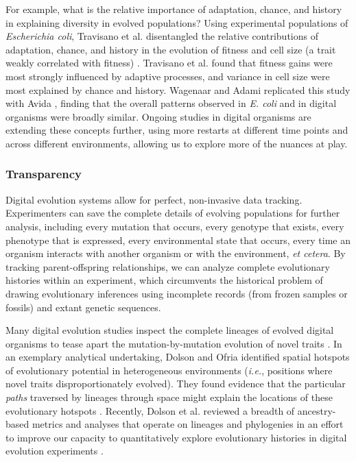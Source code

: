 For example, what is the relative importance of adaptation, chance, and history in explaining diversity in evolved populations? 
Using experimental populations of \textit{Escherichia coli}, Travisano et al. disentangled the relative contributions of adaptation, chance, and history in the evolution of fitness and cell size (a trait weakly correlated with fitness) \citep{travisano_experimental_1995}.
Travisano et al. found that fitness gains were most strongly influenced by adaptive processes, and variance in cell size were most explained by chance and history. 
Wagenaar and Adami replicated this study with Avida \citep{wagenaar_influence_2004}, finding that the overall patterns observed in \textit{E. coli} and in digital organisms were broadly similar.
Ongoing studies in digital organisms are extending these concepts further, using more restarts at different time points and across different environments, allowing us to explore more of the nuances at play.

\subsubsection{Transparency}

Digital evolution systems allow for perfect, non-invasive data tracking.
Experimenters can save the complete details of evolving populations for further analysis, including every mutation that occurs, every genotype that exists, every phenotype that is expressed, every environmental state that occurs, every time an organism interacts with another organism or with the environment, \textit{et cetera}.
By tracking parent-offspring relationships, we can analyze complete evolutionary histories within an experiment, which circumvents the historical problem of drawing evolutionary inferences using incomplete records (from frozen samples or fossils) and extant genetic sequences.

Many digital evolution studies inspect the complete lineages of evolved digital organisms to tease apart the mutation-by-mutation evolution of novel traits \citep{lenski_evolutionary_2003,dolson_spatial_2017,grabowski_case_2013,goldsby_evolutionary_2014,pontes_evolutionary_2020}.
In an exemplary analytical undertaking, Dolson and Ofria identified spatial hotspots of evolutionary potential in heterogeneous environments (\textit{i.e.}, positions where novel traits disproportionately evolved).
They found evidence that the particular \textit{paths} traversed by lineages through space might explain the locations of these evolutionary hotspots \citep{dolson_hotspots_2017}. 
Recently, Dolson et al. reviewed a breadth of ancestry-based metrics and analyses that operate on lineages and phylogenies in an effort to improve our capacity to quantitatively explore evolutionary histories in digital evolution experiments \citep{dolson_interpreting_2020}.

